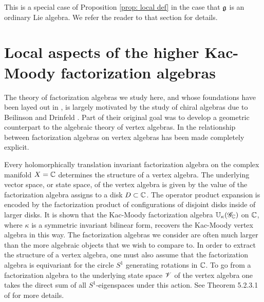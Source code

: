\documentclass[10pt]{amsart}
\begin{document}
This is a special case of Proposition \ref{prop: local def} in the case that $\mathfrak g$ is an ordinary Lie algebra.  
We refer the reader to that section for details.

\section{Local aspects of the higher Kac-Moody factorization algebras} 
\label{sec: sphere ops}

The theory of factorization algebras we study here, and whose foundations have been layed out in \cite{CG1}, is largely motivated by the study of chiral algebras due to Beilinson and Drinfeld \cite{BD}.
Part of their original goal was to develop a geometric counterpart to the algebraic theory of vertex algebras. 
In \cite{CG1} the relationship between factorization algebras on vertex algebras has been made completely explicit. 

Every holomorphically translation invariant factorization algebra on the complex manifold $X = \mathbb C$ determines the structure of a vertex algebra.
The underlying vector space, or state space, of the vertex algebra is given by the value of the factorization algebra assigns to a disk $D \subset \mathbb C$. 
The operator product expansion is encoded by the factorization product of configurations of disjoint disks inside of larger disks. 
It is shown that the Kac-Moody factorization algebra $\mathbb U_{\kappa}(\mathscr G_\mathbb C)$ on $\mathbb C$, where $\kappa$ is a symmetric invariant bilinear form, recovers the Kac-Moody vertex algebra in this way. 
The factorization algebras we consider are often much larger than the more algebraic objects that we wish to compare to. 
In order to extract the structure of a vertex algebra, one must also assume that the factorization algebra is equivariant for the circle $S^1$ generating rotations in $\mathbb C$. 
To go from a factorization algebra to the underlying state space $\mathscr V$ of the vertex algebra one takes the direct sum of all $S^1$-eigenspaces under this action. 
See Theorem 5.2.3.1 of \cite{CG1} for more details.
\end{document}
